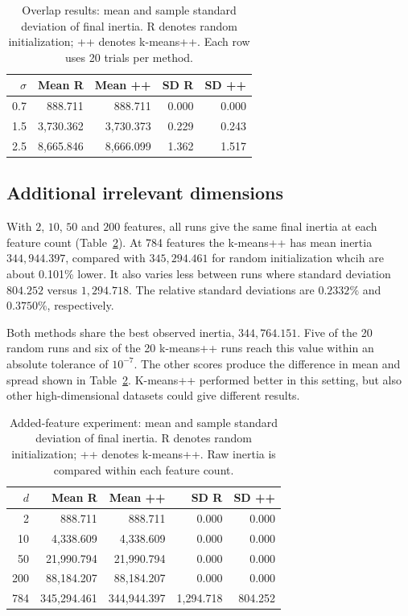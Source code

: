 \documentclass[11pt,a4paper]{article}
\begin{document}
\begin{table}[htbp]
\centering
\caption{Overlap results: mean and sample standard deviation of final inertia. R denotes random initialization; ++ denotes k-means++. Each row uses 20 trials per method.}
\label{tab:overlap}
\small
\begin{tabular}{@{}rrrrr@{}}
\toprule
$\sigma$ & Mean R & Mean ++ & SD R & SD ++\\
\midrule
0.7 & 888.711 & 888.711 & 0.000 & 0.000\\
1.5 & 3,730.362 & 3,730.373 & 0.229 & 0.243\\
2.5 & 8,665.846 & 8,666.099 & 1.362 & 1.517\\
\bottomrule
\end{tabular}
\end{table}

\subsection{Additional irrelevant dimensions}

With $2$, $10$, $50$ and $200$ features, all runs give the same final inertia at each feature count (Table~\ref{tab:dimensions}). At 784 features the k-means++ has mean inertia $344{,}944.397$, compared with $345{,}294.461$ for random initialization whcih are about 0.101\% lower. It also varies less between runs where standard deviation $804.252$ versus $1{,}294.718$. The relative standard deviations are $0.2332\%$ and $0.3750\%$, respectively.

Both methods share the best observed inertia, $344{,}764.151$. Five of the 20 random runs and six of the 20 k-means++ runs reach this value within an absolute tolerance of $10^{-7}$. The other scores produce the difference in mean and spread shown in Table~\ref{tab:dimensions}. K-means++ performed better in this setting, but also other high-dimensional datasets could give different results.

\begin{table}[htbp]
\centering
\caption{Added-feature experiment: mean and sample standard deviation of final inertia. R denotes random initialization; ++ denotes k-means++. Raw inertia is compared within each feature count.}
\label{tab:dimensions}
\small
\begin{tabular}{@{}rrrrr@{}}
\toprule
$d$ & Mean R & Mean ++ & SD R & SD ++\\
\midrule
2 & 888.711 & 888.711 & 0.000 & 0.000\\
10 & 4,338.609 & 4,338.609 & 0.000 & 0.000\\
50 & 21,990.794 & 21,990.794 & 0.000 & 0.000\\
200 & 88,184.207 & 88,184.207 & 0.000 & 0.000\\
784 & 345,294.461 & 344,944.397 & 1,294.718 & 804.252\\
\bottomrule
\end{tabular}
\end{table}
\end{document}
